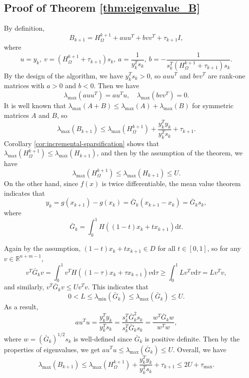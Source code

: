 \documentclass{article}
\theoremstyle{plain}
\theoremstyle{definition}
\theoremstyle{remark}
\begin{document}
\subsection{Proof of Theorem \ref{thm:eigenvalue_B}}
By definition,
\[
B_{k+1}=H_{\Omega}^{k+1}+auu^{T}+bvv^{T}+\tau_{k+1} I,
\]
where
\[
u=y_{k},\ v=(H_{\Omega}^{k+1}+\tau_{k+1})s_{k},\ a=\frac{1}{y_{k}^{T}s_{k}},\ b=-\frac{1}{s_{k}^{T}(H_{\Omega}^{k+1}+\tau_{k+1})s_{k}}.
\]
By the design of the algorithm, we have $y_k^T s_k>0$, so $auu^{T}$ and $bvv^{T}$ are rank-one matrices with $a>0$ and $b<0$. Then we have
\[
\lambda_{\max}(auu^T)=au^Tu,\quad \lambda_{\max}(bvv^T)=0.
\]
It is well known that $\lambda_{\max}(A+B)\le \lambda_{\max}(A)+\lambda_{\max}(B)$ for symmetric matrices $A$ and $B$, so
\[
\lambda_{\max}(B_{k+1})\le \lambda_{\max}(H_{\Omega}^{k+1}) + \frac{y_{k}^{T}y_{k}}{y_{k}^{T}s_{k}}+\tau_{k+1}.
\]
Corollary \ref{cor:incremental-sparsification} shows that $\lambda_{\max}(H_{\Omega}^{k+1})\le \lambda_{\max}(H_{k+1})$, and then by the assumption of the theorem, we have
\[
\lambda_{\max}(H_{\Omega}^{k+1})\le \lambda_{\max}(H_{k+1})\le U.
\]
On the other hand, since $f(x)$ is twice differentiable, the mean value theorem indicates that
\[
y_k=g(x_{k+1})-g(x_k)=\bar{G}_k(x_{k+1}-x_k)=\bar{G}_k s_k,
\]
where
\[
\bar{G}_k=\int_{0}^{1}H((1-t)x_{k}+t x_{k+1})\mathrm{d}t.
\]

Again by the assumption, $(1-t)x_{k}+t x_{k+1}\in D$ for all $t\in [0,1]$, so for any $v\in\mathbb{R}^{n+m-1}$,
\[
v^T \bar{G}_k v=\int_{0}^{1} v^T H((1-\tau)x_{k}+\tau x_{k+1}) v\mathrm{d}\tau \ge \int_{0}^{1} L v^T v\mathrm{d}\tau = Lv^T v,
\]
and similarly, $v^T \bar{G}_k v\le U v^T v$. This indicates that
\[
0 < L \le \lambda_{\min}(\bar{G}_k) \le \lambda_{\max}(\bar{G}_k) \le U.
\]
As a result,
\[
au^T u=\frac{y_k^T y_k}{y_k^T s_k}=\frac{s_{k}^{T}\bar{G}_{k}^{2}s_{k}}{s_{k}^{T}\bar{G}_{k}s_{k}}=\frac{w^T \bar{G}_k w}{w^T w},
\]
where $w=(\bar{G}_k)^{1/2}s_k$ is well-defined since $\bar{G}_k$ is positive definite. Then by the properties of eigenvalues, we get $au^T u\le \lambda_{\max}(\bar{G}_k) \le U$. Overall, we have
\[
\lambda_{\max}(B_{k+1})\le \lambda_{\max}(H_{\Omega}^{k+1}) + \frac{y_{k}^{T}y_{k}}{y_{k}^{T}s_{k}}+\tau_{k+1}\le 2U+\tau_{\max}.
\]
\end{document}
